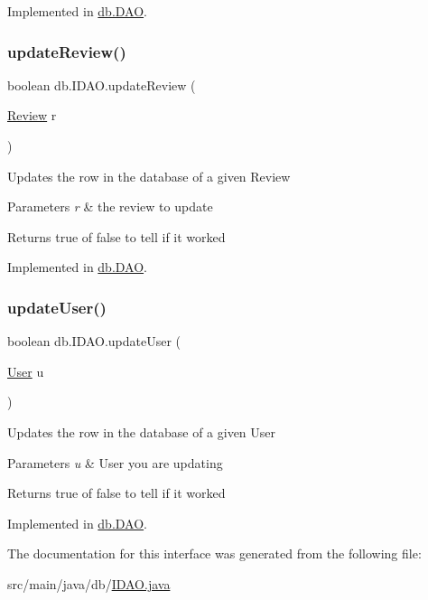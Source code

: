 Implemented in \hyperlink{classdb_1_1_d_a_o_a4ea10c177ef93a3084ed74b38556adca}{db.\+D\+AO}.

\mbox{\label{interfacedb_1_1_i_d_a_o_a7288e76ee3ce667c0d0d7ecaeef0d94e}} 
\subsubsection{\texorpdfstring{update\+Review()}{updateReview()}}
{\footnotesize\ttfamily boolean db.\+I\+D\+A\+O.\+update\+Review (\begin{DoxyParamCaption}\item[{\hyperlink{classserver_1_1data_1_1_review}{Review}}]{r }\end{DoxyParamCaption})}

Updates the row in the database of a given Review 
\begin{DoxyParams}{Parameters}
{\em r} & the review to update \\
\hline
\end{DoxyParams}
\begin{DoxyReturn}{Returns}
true of false to tell if it worked 
\end{DoxyReturn}


Implemented in \hyperlink{classdb_1_1_d_a_o_ab73940ac7600902ea7d52bcd041a9c6e}{db.\+D\+AO}.

\mbox{\label{interfacedb_1_1_i_d_a_o_adbc5f00b7bcdffb6692367a3c9564193}} 
\subsubsection{\texorpdfstring{update\+User()}{updateUser()}}
{\footnotesize\ttfamily boolean db.\+I\+D\+A\+O.\+update\+User (\begin{DoxyParamCaption}\item[{\hyperlink{classserver_1_1data_1_1_user}{User}}]{u }\end{DoxyParamCaption})}

Updates the row in the database of a given User 
\begin{DoxyParams}{Parameters}
{\em u} & User you are updating \\
\hline
\end{DoxyParams}
\begin{DoxyReturn}{Returns}
true of false to tell if it worked 
\end{DoxyReturn}


Implemented in \hyperlink{classdb_1_1_d_a_o_a5cd4462deb77065c2d12471cd73b3ec8}{db.\+D\+AO}.



The documentation for this interface was generated from the following file\+:\begin{DoxyCompactItemize}
\item 
src/main/java/db/\hyperlink{_i_d_a_o_8java}{I\+D\+A\+O.\+java}\end{DoxyCompactItemize}

